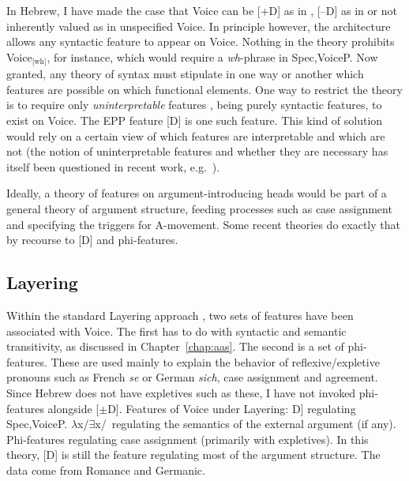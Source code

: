 In Hebrew, I have made the case that Voice can be [\!+\!D] as in {\vd}, [--D] as in {\vz} or not inherently valued as in unspecified Voice. In principle however, the architecture allows any syntactic feature to appear on Voice. Nothing in the theory prohibits Voice$_{\text{[wh]}}$, for instance, which would require a \emph{wh}-phrase in Spec,VoiceP. Now granted, any theory of syntax must stipulate in one way or another which features are possible on which functional elements. One way to restrict the theory is to require only \emph{uninterpretable} features \citep{chomsky95}, being purely syntactic features, to exist on Voice. The EPP feature [D] is one such feature. This kind of solution would rely on a certain view of which features are interpretable and which are not (the notion of uninterpretable features and whether they are necessary has itself been questioned in recent work, e.g.~\citealt{preminger14mit}).

Ideally, a theory of features on argument-introducing heads would be part of a general theory of argument structure, feeding processes such as case assignment and specifying the triggers for A-movement. Some recent theories do exactly that by recourse to [D] and phi-features.

	\subsection{Layering}
Within the standard Layering approach \citep{schaefer08,schaefer12,schaefer17oup}, two sets of features have been associated with Voice. The first has to do with syntactic and semantic transitivity, as discussed in Chapter~\ref{chap:aas}. The second is a set of phi-features. These are used mainly to explain the behavior of reflexive/expletive pronouns such as French \emph{se} or German \emph{sich}, case assignment and agreement. Since Hebrew does not have expletives such as these, I have not invoked phi-features alongside [$\pm$D].
\pex Features of Voice under Layering:
	\a {[}D] regulating Spec,VoiceP.
	\a $\lambda$x/$\exists$x/\zero~regulating the semantics of the external argument (if any).
	\a Phi-features regulating case assignment (primarily with expletives).
\xe
In this theory, [D] is still the feature regulating most of the argument structure. The data come from Romance and Germanic.

